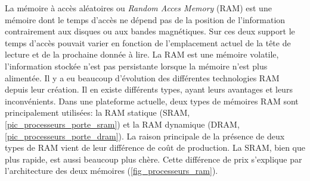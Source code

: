     La mémoire à accès aléatoires ou \textit{Random Acces Memory} (RAM) est une mémoire dont le temps d'accès ne dépend pas de la position de l'information contrairement aux disques ou aux bandes magnétiques. Sur ces deux support le temps d'accès pouvait varier en fonction de l'emplacement actuel de la tête de lecture et de la prochaine donnée à lire. La RAM est une mémoire volatile, l'information stockée n'est pas persistante lorsque la mémoire n'est plus alimentée. Il y a eu beaucoup d'évolution des différentes technologies RAM depuis leur création. Il en existe différents types, ayant leurs avantages et leurs inconvénients. Dans une plateforme actuelle, deux types de mémoires RAM sont principalement utilisées: la RAM statique (SRAM, \autoref{pic_processeurs_porte_sram}) et la RAM dynamique (DRAM, \autoref{pic_processeurs_porte_dram}). La raison principale de la présence de deux types de RAM vient de leur différence de coût de production. La SRAM, bien que plus rapide, est aussi beaucoup plus chère. Cette différence de prix s'explique par l'architecture des deux mémoires (\autoref{fig_processeurs_ram}).
    

